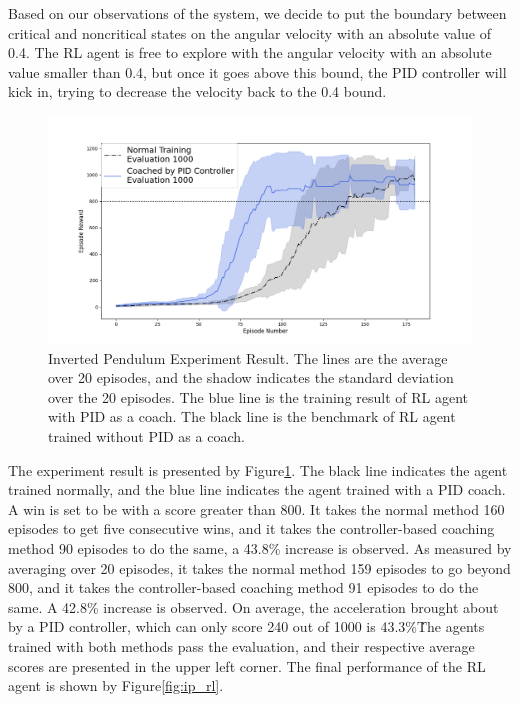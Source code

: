 \documentclass[smallextended]{svjour3}
\begin{document}
Based on our observations of the system, we decide to put the boundary between critical and noncritical states on the angular velocity with an absolute value of 0.4. The RL agent is free to explore with the angular velocity with an absolute value smaller than 0.4, but once it goes above this bound, the PID controller will kick in, trying to decrease the velocity back to the 0.4 bound.
\begin{figure}
     \centering
      \includegraphics[width=\textwidth]{ip.png}
      \caption{Inverted Pendulum Experiment Result. The lines are the average over 20 episodes, and the shadow indicates the standard deviation over the 20 episodes. The blue line is the training result of RL agent with PID as a coach. The black line is the benchmark of RL agent trained without PID as a coach. }
      \label{fig:ip_result}

\end{figure}

The experiment result is presented by Figure\ref{fig:ip_result}. The black line indicates the agent trained normally, and the blue line indicates the agent trained with a PID coach. A win is set to be with a score greater than 800. It takes the normal method 160 episodes to get five consecutive wins, and it takes the controller-based coaching method 90 episodes to do the same, a 43.8\% increase is observed. As measured by averaging over 20 episodes, it takes the normal method 159 episodes to go beyond 800, and it takes the controller-based coaching method 91 episodes to do the same. A 42.8\% increase is observed. On average, the acceleration brought about by a PID controller, which can only score 240 out of 1000 is 43.3\%\. The agents trained with both methods pass the evaluation, and their respective average scores are presented in the upper left corner. The final performance of the RL agent is shown by Figure\ref{fig:ip_rl}.
\end{document}
